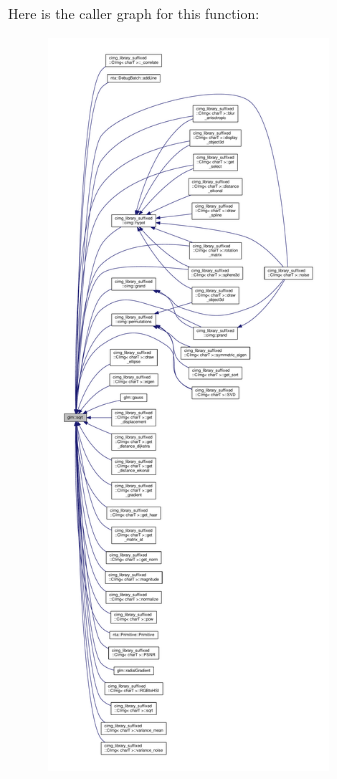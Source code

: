 Here is the caller graph for this function\+:
\nopagebreak
\begin{figure}[H]
\begin{center}
\leavevmode
\includegraphics[height=550pt]{df/d74/group__core__func__exponential_gaa83e5f1648b7ccdf33b87c07c76cb77c_icgraph}
\end{center}
\end{figure}
